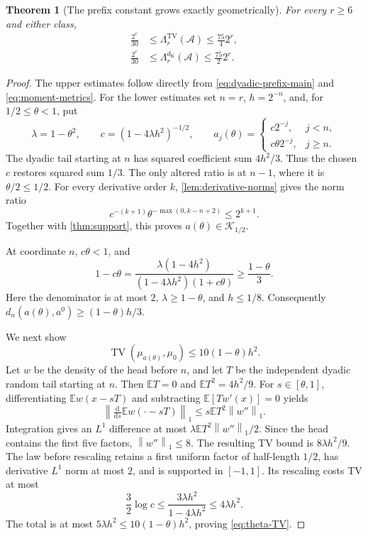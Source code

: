 \documentclass[11pt,a4paper]{article}
\numberwithin{equation}{section}
\newtheorem{theorem}{Theorem}[section]
\theoremstyle{definition}
\theoremstyle{remark}
\DeclareMathOperator{\TV}{TV}
\newcommand{\E}{\mathbb E}
\newcommand{\K}{\mathcal K}
\newcommand{\norm}[1]{\left\lVert #1\right\rVert}
\newcommand{\dK}{d_{\mathrm K}}
\begin{document}
\begin{theorem}[The prefix constant grows exactly geometrically]
\label{thm:prefix}
For every $r\ge6$ and either class,
\begin{align}
 \frac{2^r}{30}&\le\Lambda_r^{\TV}(\mathcal A)
                       \le\frac{75}{4}2^r, \label{eq:prefix-TV}\\
 \frac{2^r}{30}&\le\Lambda_r^{\dK}(\mathcal A)
                       \le\frac{75}{2}2^r. \label{eq:prefix-K}
\end{align}
\end{theorem}
\begin{proof}
The upper estimates follow directly from \eqref{eq:dyadic-prefix-main}
and \eqref{eq:moment-metrics}. For the lower estimates set $n=r$, $h=2^{-n}$,
and, for $1/2\le\theta<1$, put
\begin{equation}
 \lambda=1-\theta^2,\qquad c=(1-4\lambda h^2)^{-1/2},\qquad
 a_j(\theta)=
 \begin{cases}
 c2^{-j},&j<n,\\
 c\theta2^{-j},&j\ge n.
 \end{cases}
 \label{eq:tail-deformation}
\end{equation}
The dyadic tail starting at $n$ has squared coefficient sum $4h^2/3$.
Thus the chosen $c$ restores squared sum $1/3$. The only altered ratio is
at $n-1$, where it is $\theta/2\le1/2$.
For every derivative order $k$, \cref{lem:derivative-norms} gives the norm
ratio
\[
 c^{-(k+1)}\theta^{-\max(0,k-n+2)}\le2^{k+1}.
\]
Together with \cref{thm:support}, this proves $a(\theta)\in\K_{1/2}$.

At coordinate $n$, $c\theta<1$, and
\begin{equation}
 1-c\theta
 =\frac{\lambda(1-4h^2)}{(1-4\lambda h^2)(1+c\theta)}
 \ge\frac{1-\theta}{3}.
 \label{eq:theta-gap}
\end{equation}
Here the denominator is at most $2$, $\lambda\ge1-\theta$, and
$h\le1/8$. Consequently $d_n(a(\theta),a^0)\ge(1-\theta)h/3$.

We next show
\begin{equation}
 \TV(\mu_{a(\theta)},\mu_0)\le10(1-\theta)h^2.
 \label{eq:theta-TV}
\end{equation}
Let $w$ be the density of the head before $n$, and let $T$ be the independent
dyadic random tail starting at $n$. Then $\E T=0$ and
$\E T^2=4h^2/9$. For $s\in[\theta,1]$, differentiating
$\E w(x-sT)$ and subtracting $\E[T w'(x)]=0$ yields
\[
 \norm{\tfrac{\mathrm d}{\mathrm ds}\E w(\cdot-sT)}_1
 \le s\E T^2\norm{w''}_1.
\]
Integration gives an $L^1$ difference at most
$\lambda\E T^2\norm{w''}_1/2$. Since the head contains the first five
factors, $\norm{w''}_1\le8$. The resulting TV bound is
$8\lambda h^2/9$. The law before rescaling retains a first uniform factor
of half-length $1/2$, has derivative $L^1$ norm at most $2$, and is supported
in $[-1,1]$. Its rescaling costs TV at most
\[
 \frac32\log c\le\frac{3\lambda h^2}{1-4\lambda h^2}
 \le4\lambda h^2.
\]
The total is at most $5\lambda h^2\le10(1-\theta)h^2$, proving
\eqref{eq:theta-TV}.


\end{proof}
\end{document}
